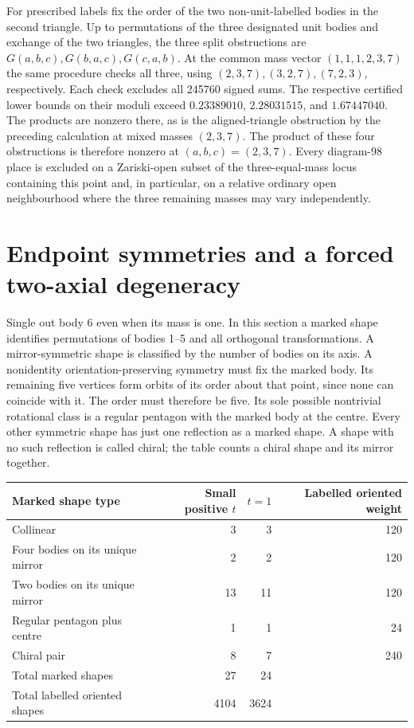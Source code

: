 \documentclass[11pt]{article}
\begin{document}
For prescribed labels fix the order of the two non-unit-labelled bodies in
the second triangle. Up to permutations of the three designated unit
bodies and exchange of the two triangles, the three split obstructions
are $G(a,b,c),G(b,a,c),G(c,a,b)$. At the common mass vector
$(1,1,1,2,3,7)$ the same procedure checks all three, using
$(2,3,7),(3,2,7),(7,2,3)$, respectively. Each check excludes all
245760 signed sums. The respective certified lower bounds on their
moduli exceed $0.23389010$, $2.28031515$, and $1.67447040$.
The products are nonzero there, as is the aligned-triangle obstruction
by the preceding calculation at mixed masses $(2,3,7)$. The product
of these four obstructions is therefore nonzero at $(a,b,c)=(2,3,7)$.
Every diagram-98 place is excluded on a Zariski-open subset of the
three-equal-mass locus containing this point and, in particular, on a
relative ordinary open neighbourhood where the three remaining masses
may vary independently.

\section{Endpoint symmetries and a forced two-axial degeneracy}
Single out body 6 even when its mass is one. In this section a marked
shape identifies permutations of bodies 1--5 and all orthogonal
transformations. A mirror-symmetric shape is classified by the number of
bodies on its axis. A nonidentity orientation-preserving symmetry must fix
the marked body. Its remaining five vertices form orbits of its order about
that point, since none can coincide with it. The order must therefore be
five. Its sole possible nontrivial rotational class is a regular pentagon
with the marked body at the centre. Every other symmetric shape has just
one reflection as a marked shape. A shape with no such reflection is
called chiral; the table counts a chiral shape and its mirror together.

\begin{center}
\begin{tabular}{lrrr}
\toprule
Marked shape type & Small positive $t$ & $t=1$ & Labelled oriented weight\\
\midrule
Collinear                    &3&3&120\\
Four bodies on its unique mirror &2&2&120\\
Two bodies on its unique mirror  &13&11&120\\
Regular pentagon plus centre     &1&1&24\\
Chiral pair                      &8&7&240\\
\midrule
Total marked shapes              &27&24&\\
Total labelled oriented shapes   &4104&3624&\\
\bottomrule
\end{tabular}
\end{center}
\end{document}
